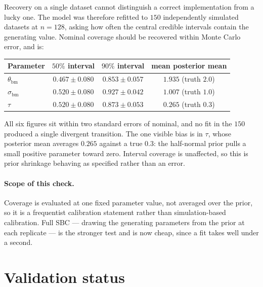 \documentclass[11pt]{article}
\begin{document}
Recovery on a single dataset cannot distinguish a correct implementation from a lucky one. The model
was therefore refitted to $150$ independently simulated datasets at $n = 128$, asking how often the
central credible intervals contain the generating value. Nominal coverage should be recovered within
Monte Carlo error, and is:

\begin{center}
\begin{tabular}{@{}lccc@{}}
\toprule
Parameter & $50\%$ interval & $90\%$ interval & mean posterior mean \\
\midrule
$\theta_{\mathrm{bm}}$ & $0.467 \pm 0.080$ & $0.853 \pm 0.057$ & $1.935$ \quad (truth $2.0$) \\
$\sigma_{\mathrm{bm}}$ & $0.520 \pm 0.080$ & $0.927 \pm 0.042$ & $1.007$ \quad (truth $1.0$) \\
$\tau$                 & $0.520 \pm 0.080$ & $0.873 \pm 0.053$ & $0.265$ \quad (truth $0.3$) \\
\bottomrule
\end{tabular}
\end{center}

\noindent
All six figures sit within two standard errors of nominal, and no fit in the $150$ produced a single
divergent transition. The one visible bias is in $\tau$, whose posterior mean averages $0.265$ against
a true $0.3$: the half-normal prior pulls a small positive parameter toward zero. Interval coverage is
unaffected, so this is prior shrinkage behaving as specified rather than an error.

\paragraph{Scope of this check.} Coverage is evaluated at one fixed parameter value, not averaged over
the prior, so it is a frequentist calibration statement rather than simulation-based calibration.
Full SBC --- drawing the generating parameters from the prior at each replicate --- is the stronger
test and is now cheap, since a fit takes well under a second.

\section{Validation status}
\end{document}
